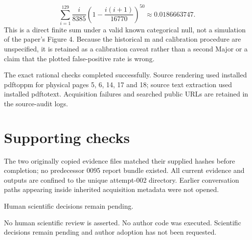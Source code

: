 \documentclass[10pt]{article}
\begin{document}
\[\sum_{i=1}^{129}\frac{i}{8385}
\left(1-\frac{i(i+1)}{16770}\right)^{50}
\approx0.0186663747.\] This is a direct finite sum under a valid known categorical null, not a simulation of the paper’s Figure 4. Because the historical m and calibration procedure are unspecified, it is retained as a calibration caveat rather than a second Major or a claim that the plotted false-positive rate is wrong.\par
The exact rational checks completed successfully. Source rendering used installed pdftoppm for physical pages 5, 6, 14, 17 and 18; source text extraction used installed pdftotext. Acquisition failures and searched public URLs are retained in the source-audit logs.\par
\section*{Supporting checks}
The two originally copied evidence files matched their supplied hashes before completion; no predecessor 0095 report bundle existed. All current evidence and outputs are confined to the unique attempt-002 directory. Earlier conversation paths appearing inside inherited acquisition metadata were not opened.\par
Human scientific decisions remain pending.\par
No human scientific review is asserted. No author code was executed. Scientific decisions remain pending and author adoption has not been requested.\par
\end{document}

